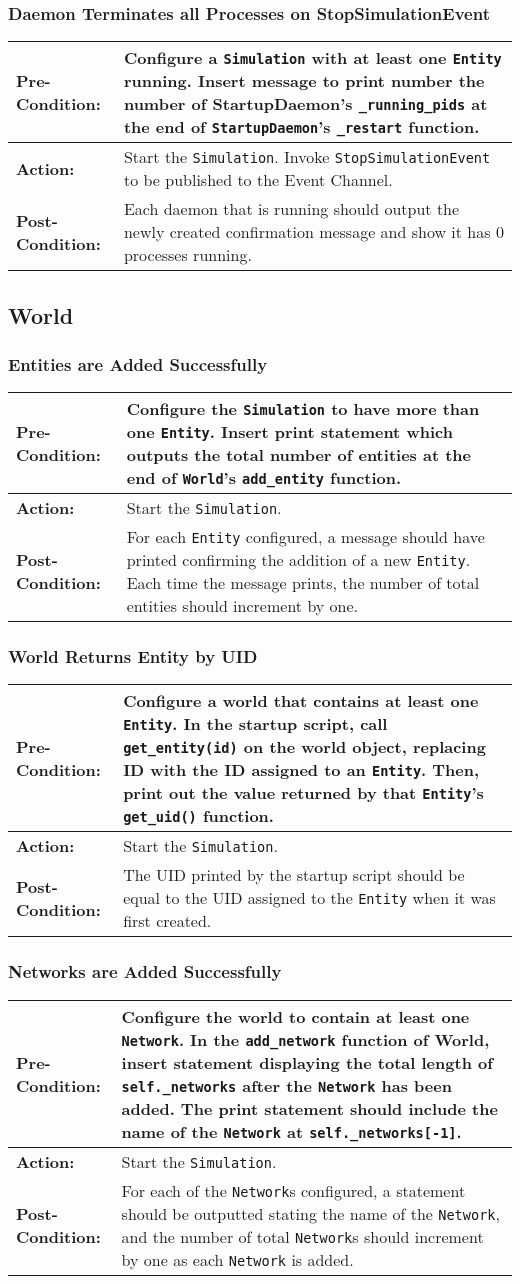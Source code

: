 \documentclass[titlepage]{article}
\newcommand{\testcase}[3]{
    \begin{center}
    \begin{tabular}{| l | p{0.7\textwidth}|}
        \hline
        \rowcolor[gray]{0.8}\textbf{Pre-Condition:} & #1 \\ \hline
        \textbf{Action:} & #2 \\ \hline
        \rowcolor[gray]{0.8}\textbf{Post-Condition:} & #3 \\ \hline
    \end{tabular}
    \end{center}
}
\begin{document}
\subsubsection{Daemon Terminates all Processes on StopSimulationEvent}
\testcase{Configure a \texttt{Simulation} with at least one \texttt{Entity} running.  Insert message to print number the number of StartupDaemon's \texttt{\_running\_pids} at the end of \texttt{StartupDaemon}'s \texttt{\_restart} function.}{Start the \texttt{Simulation}. Invoke \texttt{StopSimulationEvent} to be published to the Event Channel.}{Each daemon that is running should output the newly created confirmation message and show it has 0 processes running.}

\subsection{World}
\subsubsection{Entities are Added Successfully}
\testcase{Configure the \texttt{Simulation} to have more than one \texttt{Entity}.  Insert print statement which outputs the total number of entities at the end of \texttt{World}'s \texttt{add\_entity} function.}{Start the \texttt{Simulation}.}{For each \texttt{Entity} configured, a message should have printed confirming the addition of a new \texttt{Entity}.  Each time the message prints, the number of total entities should increment by one.}

\subsubsection{World Returns Entity by UID}
\testcase{Configure a world that contains at least one \texttt{Entity}. In the startup script, call \texttt{get\_entity(id)} on the world object, replacing ID with the ID assigned to an \texttt{Entity}. Then, print out the value returned by that \texttt{Entity}'s  \texttt{get\_uid()} function.}{Start the \texttt{Simulation}.}{The UID printed by the startup script should be equal to the UID assigned to the \texttt{Entity} when it was first created.}

\subsubsection{Networks are Added Successfully}
\testcase{Configure the world to contain at least one \texttt{Network}.  In the \texttt{add\_network} function of World, insert statement displaying the total length of \texttt{self.\_networks} after the \texttt{Network} has been added. The print statement should include the name of the \texttt{Network} at \texttt{self.\_networks[-1]}.}{Start the \texttt{Simulation}.}{For each of the \texttt{Network}s configured, a statement should be outputted stating the name of the \texttt{Network}, and the number of total \texttt{Network}s should increment by one as each \texttt{Network} is added.}
\end{document}
